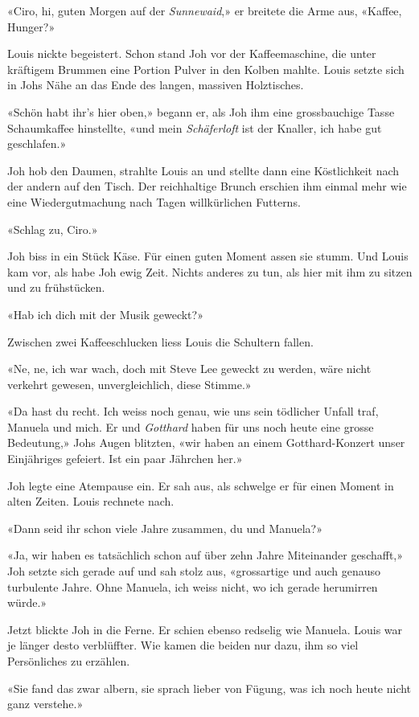 «Ciro, hi, guten Morgen auf der \emph{Sunnewaid},» er breitete die Arme
aus, «Kaffee, Hunger?»

Louis nickte begeistert. Schon stand Joh vor der Kaffeemaschine, die unter kräftigem Brummen eine Portion Pulver in
den Kolben mahlte. Louis setzte sich in Johs Nähe an das Ende des langen, massiven Holztisches.

«Schön habt ihr’s hier oben,» begann er, als Joh ihm eine grossbauchige
Tasse Schaumkaffee hinstellte, «und mein \emph{Schäferloft} ist der
Knaller, ich habe gut geschlafen.»

Joh hob den Daumen, strahlte Louis an und stellte dann eine Köstlichkeit
nach der andern auf den Tisch. Der reichhaltige Brunch erschien ihm einmal mehr wie eine Wiedergutmachung nach
Tagen willkürlichen Futterns.

«Schlag zu, Ciro.»

Joh biss in ein Stück Käse. Für einen guten Moment assen sie stumm. Und
Louis kam vor, als habe Joh ewig Zeit. Nichts anderes zu tun, als hier
mit ihm zu sitzen und zu frühstücken.

«Hab ich dich mit der Musik geweckt?»

Zwischen zwei Kaffeeschlucken liess Louis die Schultern fallen.

«Ne, ne, ich war wach, doch mit Steve Lee geweckt zu werden, wäre nicht
verkehrt gewesen, unvergleichlich, diese Stimme.»

«Da hast du recht. Ich weiss noch genau, wie uns sein tödlicher Unfall
traf, Manuela und mich. Er und \emph{Gotthard} haben für uns noch heute
eine grosse Bedeutung,» Johs Augen blitzten, «wir haben an einem
Gotthard-Konzert unser Einjähriges gefeiert. Ist ein paar Jährchen her.»

Joh legte eine Atempause ein. Er sah aus, als schwelge er für einen
Moment in alten Zeiten.
Louis rechnete nach.

«Dann seid ihr schon viele Jahre zusammen, du und Manuela?»

«Ja, wir haben es tatsächlich schon auf über zehn Jahre Miteinander
geschafft,» Joh setzte sich gerade auf und sah stolz aus, «grossartige
und auch genauso turbulente Jahre. Ohne Manuela, ich weiss nicht, wo ich
gerade herumirren würde.»

Jetzt blickte Joh in die Ferne. Er schien ebenso redselig wie Manuela.
Louis war je länger desto verblüffter. Wie kamen die beiden nur dazu, ihm so viel Persönliches zu erzählen.

«Sie fand das zwar albern, sie sprach lieber von Fügung, was ich noch heute nicht ganz verstehe.»

